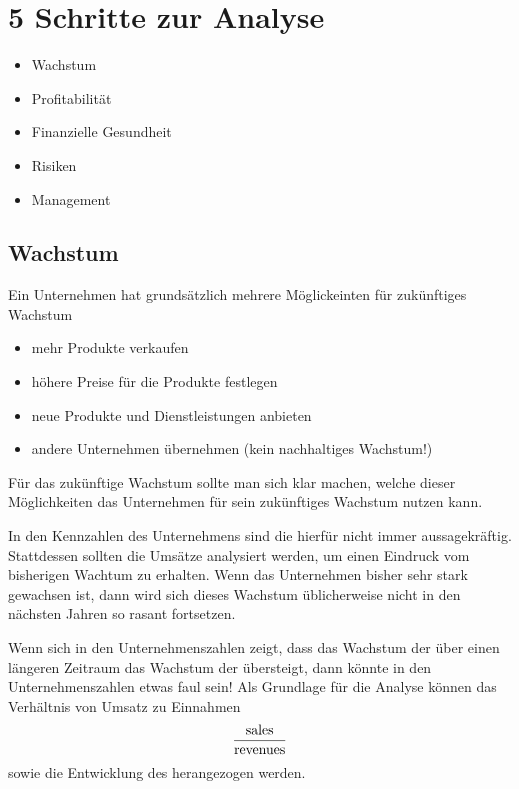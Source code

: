 

\chapter{5 Schritte zur Analyse}
\begin{itemize}
    \item Wachstum
    \item Profitabilität
    \item Finanzielle Gesundheit
    \item Risiken
    \item Management
\end{itemize}

\section{Wachstum}

Ein Unternehmen hat grundsätzlich mehrere Möglickeinten für zukünftiges Wachstum
\begin{itemize}
    \item mehr Produkte verkaufen
    \item höhere Preise für die Produkte festlegen
    \item neue Produkte und Dienstleistungen anbieten
    \item andere Unternehmen übernehmen (kein nachhaltiges Wachstum!)
\end{itemize}

Für das zukünftige Wachstum sollte man sich klar machen, welche dieser Möglichkeiten das Unternehmen für sein zukünftiges Wachstum nutzen kann.

In den Kennzahlen des Unternehmens sind die \earnings hierfür nicht immer aussagekräftig. 
Stattdessen sollten die Umsätze \sales analysiert werden, um einen Eindruck vom bisherigen Wachtum zu erhalten.
Wenn das Unternehmen bisher sehr stark gewachsen ist, dann wird sich dieses Wachstum üblicherweise nicht in den nächsten Jahren so rasant fortsetzen.

Wenn sich in den Unternehmenszahlen zeigt, dass das Wachstum der \earnings über einen längeren Zeitraum das Wachstum der \sales übersteigt, dann könnte in den Unternehmenszahlen etwas faul sein!
Als Grundlage für die Analyse können das Verhältnis von Umsatz zu Einnahmen
\begin{align}
    \frac{\text{sales}}{\text{revenues}}
\end{align}
sowie die Entwicklung des  herangezogen werden.

